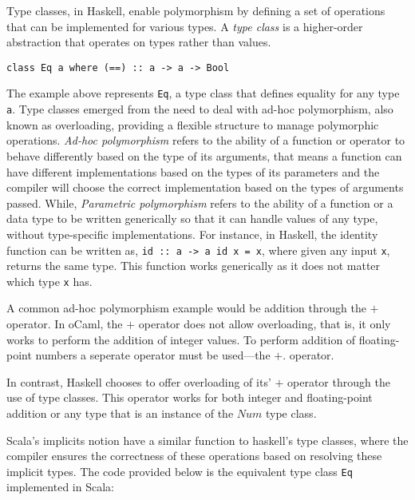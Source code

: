 Type classes, in Haskell, enable polymorphism by defining a set of operations that can be implemented for various types. A \textit{type class} is a higher-order abstraction that operates on types rather than values.

\lstinline{class Eq a where (==) :: a -> a -> Bool}

The example above represents \lstinline{Eq}, a type class that defines equality for any type \lstinline{a}. Type classes emerged from the need to deal with ad-hoc polymorphism, also known as overloading, providing a flexible structure to manage polymorphic operations. 
\textit{Ad-hoc polymorphism} refers to the ability of a function or operator to behave differently based on the type of its arguments, that means a function can have different implementations based on the types of its parameters and the compiler will choose the correct implementation based on the types of arguments passed.
While, \textit{Parametric polymorphism} refers to the ability of a function or a data type to be written generically so that it can handle values of any type, without type-specific implementations. For instance, in Haskell, the identity function can be written as, \lstinline{id :: a -> a id x = x}, where given any input \lstinline{x}, returns the same type. This function works generically as it does not matter which type \lstinline{x} has.


A common ad-hoc polymorphism example would be addition through the $+$ operator. In oCaml, the $+$ operator does not allow overloading, that is, it only works to perform the addition of integer values. To perform addition of floating-point numbers a seperate operator must be used---the $+.$ operator.

In contrast, Haskell chooses to offer overloading of its' $+$ operator through the use of type classes. This operator works for both integer and floating-point addition or any type that is an instance of the $Num$ type class.

Scala’s implicits notion have a similar function to haskell's type classes, where the compiler ensures the correctness of these operations based on resolving these implicit types. The code provided below is the equivalent type class \lstinline{Eq} implemented in Scala: 




\LIMPA